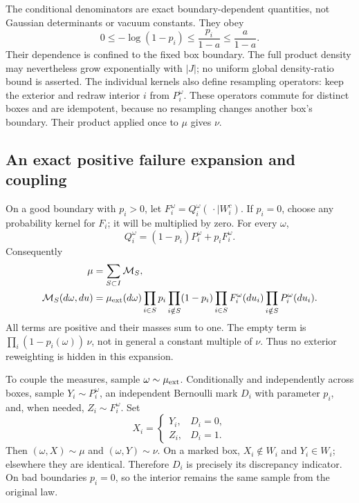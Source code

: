 The conditional denominators are exact boundary-dependent quantities,
not Gaussian determinants or vacuum constants. They obey
\begin{equation}
 0\le-\log(1-p_i)\le\frac{p_i}{1-a}\le\frac a{1-a}.
 \label{nbr-denominator-bound}
\end{equation}
Their dependence is confined to the fixed box boundary. The full
product density may nevertheless grow exponentially with \(|J|\);
no uniform global density-ratio bound is asserted.
The individual kernels also define resampling operators: keep the
exterior and redraw interior \(i\) from \(P_i^\omega\). These
operators commute for distinct boxes and are idempotent, because no
resampling changes another box's boundary. Their product applied once
to \(\mu\) gives \(\nu\).

\subsection{An exact positive failure expansion and coupling}
\label{nbr-coupling-section}

On a good boundary with \(p_i>0\), let
\(F_i^\omega=Q_i^\omega(\,\cdot\mid W_i^c)\).
If \(p_i=0\), choose any probability kernel for \(F_i\); it will be
multiplied by zero. For every \(\omega\),
\begin{equation}
 Q_i^\omega=(1-p_i)P_i^\omega+p_iF_i^\omega.
 \label{nbr-one-mixture}
\end{equation}
Consequently
\begin{align}
 \mu&=\sum_{S\subset I}\mathcal M_S,\notag\\
 \mathcal M_S(d\omega,du)
 &=\mu_{\rm ext}(d\omega)
   \prod_{i\in S}p_i\prod_{i\notin S}(1-p_i)
   \prod_{i\in S}F_i^\omega(du_i)
   \prod_{i\notin S}P_i^\omega(du_i).
 \label{nbr-failure-expansion}
\end{align}
All terms are positive and their masses sum to one. The empty term is
\(\prod_i(1-p_i(\omega))\,\nu\), not in general a constant multiple
of \(\nu\). Thus no exterior reweighting is hidden in this expansion.

To couple the measures, sample \(\omega\sim\mu_{\rm ext}\).
Conditionally and independently across boxes, sample
\(Y_i\sim P_i^\omega\), an independent Bernoulli mark \(D_i\) with
parameter \(p_i\), and, when needed, \(Z_i\sim F_i^\omega\). Set
\begin{equation}
 X_i=\begin{cases}Y_i,&D_i=0,\\Z_i,&D_i=1.\end{cases}
 \label{nbr-coupling}
\end{equation}
Then \((\omega,X)\sim\mu\) and \((\omega,Y)\sim\nu\).
On a marked box, \(X_i\notin W_i\) and \(Y_i\in W_i\); elsewhere
they are identical. Therefore \(D_i\) is precisely its discrepancy
indicator. On bad boundaries \(p_i=0\), so the interior remains the
same sample from the original law.

